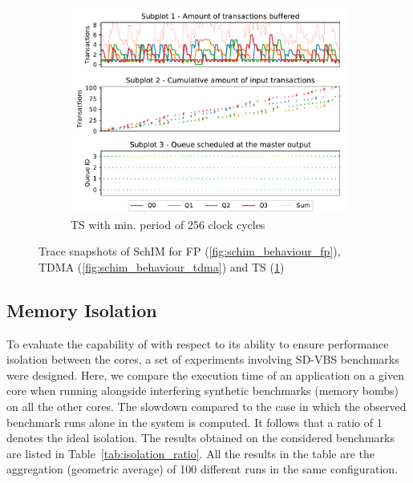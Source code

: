 \begin{figure}[]
\begin{subfigure}{0.45\textwidth}
      \end{subfigure}
      \vfill
      \begin{subfigure}{0.45\textwidth}
        \centering
        \includegraphics[scale=0.43]{images/SchIM_MG_buffering.pdf}
        \caption{TS with min. period of 256 clock cycles}
        \label{fig:schim_behaviour_mg}
      \end{subfigure}
      \caption{Trace snapshots of SchIM for FP (\ref{fig:schim_behaviour_fp}), TDMA (\ref{fig:schim_behaviour_tdma}) and TS (\ref{fig:schim_behaviour_mg})}
      \label{fig:schim_behaviour}
    \end{figure}

\subsection{Memory Isolation}\label{subsec:isolation}
To evaluate the capability of \schim with respect to its ability to
ensure performance isolation between the cores, a set of experiments
involving SD-VBS benchmarks were designed. Here, we compare the
execution time of an application on a given core when running
alongside interfering synthetic benchmarks (memory bombs) on all the
other cores. The slowdown compared to the case in which the observed
benchmark runs alone in the system is computed. It follows that a
ratio of 1 denotes the ideal isolation. The results obtained on the
considered benchmarks are listed in
Table~\ref{tab:isolation_ratio}. All the results in the table are the
aggregation (geometric average) of 100 different runs in the same
configuration.

